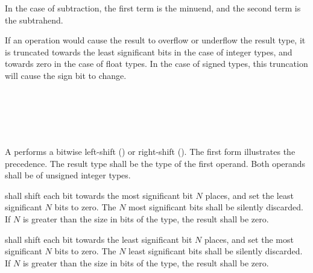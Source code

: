 \specsubsubitem
In the case of subtraction, the first term is the minuend, and the second term
is the subtrahend.

\specsubsubitem
If an operation would cause the result to overflow or underflow the result
type, it is truncated towards the least significant bits in the case of integer
types, and towards zero in the case of float types. In the case of signed
types, this truncation will cause the sign bit to change.


\begin{grammar}
 \\
	 \\
	 \terminal{\textless{}\textless{}}  \\
	 \terminal{\textgreater{}\textgreater{}}  \\
\end{grammar}

\specsubsubitem
A  performs a bitwise left-shift
(\terminal{\textless{}\textless{}}) or right-shift (\terminal{\textgreater{}\textgreater{}}). The first
form illustrates the precedence. The result type shall be the type of the first
operand. Both operands shall be of unsigned integer types.

\specsubsubitem
{} shall shift
each bit towards the most significant bit $N$ places, and set the least
significant $N$ bits to zero. The $N$ most significant bits shall be silently
discarded. If $N$ is greater than the size in bits of the type, the result shall
be zero.


\specsubsubitem
{} shall shift
each bit towards the least significant bit $N$ places, and set the most
significant $N$ bits to zero. The $N$ least significant bits shall be silently
discarded. If $N$ is greater than the size in bits of the type, the result shall
be zero.



